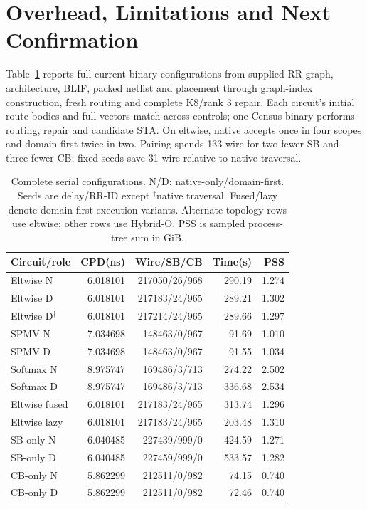 \documentclass[conference,10pt]{IEEEtran}
\begin{document}
\section{Overhead, Limitations and Next Confirmation}
Table~\ref{tab:completecost} reports full current-binary configurations from supplied RR graph, architecture, BLIF, packed netlist and placement through graph-index construction, fresh routing and complete K8/rank 3 repair. Each circuit's initial route bodies and full vectors match across controls; one Census binary performs routing, repair and candidate STA. On eltwise, native accepts once in four scopes and domain-first twice in two. Pairing spends 133 wire for two fewer SB and three fewer CB; fixed seeds save 31 wire relative to native traversal.
\begin{table}[t]
\centering\footnotesize\setlength{\tabcolsep}{3pt}
\caption{Complete serial configurations. N/D: native-only/domain-first. Seeds are delay/RR-ID except $^\dagger$native traversal. Fused/lazy denote domain-first execution variants. Alternate-topology rows use eltwise; other rows use Hybrid-O. PSS is sampled process-tree sum in GiB.}
\label{tab:completecost}
\begin{tabular}{lrrrr}\hline
Circuit/role & CPD(ns) & Wire/SB/CB & Time(s) & PSS\\\hline
Eltwise N&6.018101&217050/26/968&290.19&1.274\\
Eltwise D&6.018101&217183/24/965&289.21&1.302\\
Eltwise D$^\dagger$&6.018101&217214/24/965&289.66&1.297\\
SPMV N&7.034698&148463/0/967&91.69&1.010\\
SPMV D&7.034698&148463/0/967&91.55&1.034\\
Softmax N&8.975747&169486/3/713&274.22&2.502\\
Softmax D&8.975747&169486/3/713&336.68&2.534\\
Eltwise fused&6.018101&217183/24/965&313.74&1.296\\
Eltwise lazy&6.018101&217183/24/965&203.48&1.310\\
SB-only N&6.040485&227439/999/0&424.59&1.271\\
SB-only D&6.040485&227459/999/0&533.57&1.282\\
CB-only N&5.862299&212511/0/982&74.15&0.740\\
CB-only D&5.862299&212511/0/982&72.46&0.740\\\hline
\end{tabular}
\end{table}
\end{document}
